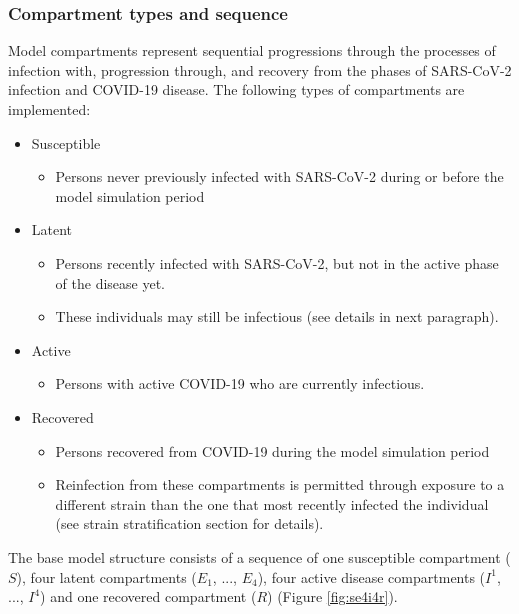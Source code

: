 \subsubsection{Compartment types and sequence}
Model compartments represent sequential progressions through the processes of 
infection with, progression through, and recovery from the phases of SARS-CoV-2
infection and COVID-19 disease. The following types of compartments are implemented:
\begin{itemize}
    \item Susceptible
    \begin{itemize}
        \item Persons never previously infected with SARS-CoV-2 during or before the model simulation period
    \end{itemize}
    \item Latent
    \begin{itemize}
        \item Persons recently infected with SARS-CoV-2, but not in the active phase of the disease yet.
        \item These individuals may still be infectious (see details in next paragraph).
    \end{itemize}
    \item Active
    \begin{itemize}
        \item Persons with active COVID-19 who are currently infectious.
    \end{itemize}
    \item Recovered
    \begin{itemize}
        \item Persons recovered from COVID-19 during the model simulation period       
        \item Reinfection from these compartments is permitted through exposure to a different
        strain than the one that most recently infected the individual (see strain stratification section for details).
    \end{itemize}
\end{itemize}
The base model structure consists of a sequence of one susceptible compartment ($S$), four latent compartments ($E_1$, ..., $E_4$), four active disease compartments ($I^1$, ..., $I^4$) and one recovered compartment ($R$) (Figure \ref{fig:se4i4r}).

